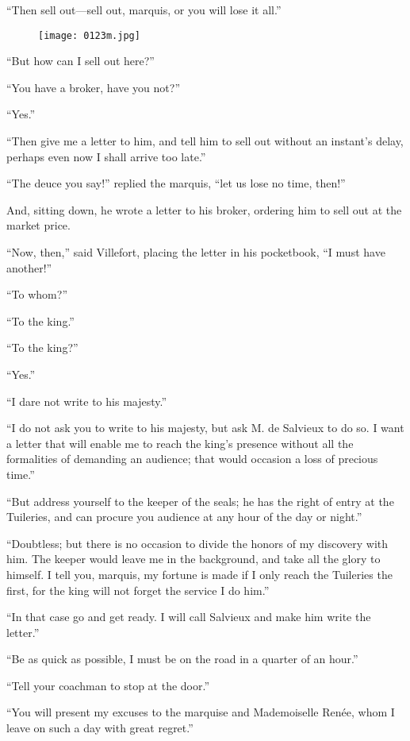 “Then sell out—sell out, marquis, or you will lose it all.”

\begin{figure}[h]
\texttt{[image: 0123m.jpg]}
\end{figure}

“But how can I sell out here?”

“You have a broker, have you not?”

“Yes.”

“Then give me a letter to him, and tell him to sell out without an
instant’s delay, perhaps even now I shall arrive too late.”

“The deuce you say!” replied the marquis, “let us lose no time, then!”

And, sitting down, he wrote a letter to his broker, ordering him to
sell out at the market price.

“Now, then,” said Villefort, placing the letter in his pocketbook, “I
must have another!”

“To whom?”

“To the king.”

“To the king?”

“Yes.”

“I dare not write to his majesty.”

“I do not ask you to write to his majesty, but ask M. de Salvieux to do
so. I want a letter that will enable me to reach the king’s presence
without all the formalities of demanding an audience; that would
occasion a loss of precious time.”

“But address yourself to the keeper of the seals; he has the right of
entry at the Tuileries, and can procure you audience at any hour of the
day or night.”

“Doubtless; but there is no occasion to divide the honors of my
discovery with him. The keeper would leave me in the background, and
take all the glory to himself. I tell you, marquis, my fortune is made
if I only reach the Tuileries the first, for the king will not forget
the service I do him.”

“In that case go and get ready. I will call Salvieux and make him write
the letter.”

“Be as quick as possible, I must be on the road in a quarter of an
hour.”

“Tell your coachman to stop at the door.”

“You will present my excuses to the marquise and Mademoiselle Renée,
whom I leave on such a day with great regret.”

